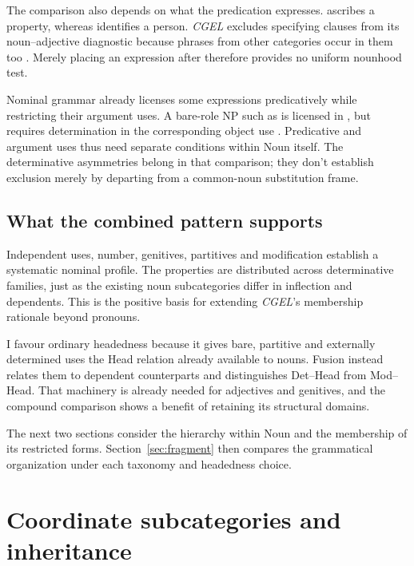 \documentclass[12pt]{article}
\begin{document}
The comparison also depends on what the predication expresses.  ascribes a property, whereas  identifies a person. \textit{CGEL} excludes specifying  clauses from its noun--adjective diagnostic because phrases from other categories occur in them too \citep[536]{huddleston2002}. Merely placing an expression after  therefore provides no uniform nounhood test.

Nominal grammar already licenses some expressions predicatively while restricting their argument uses. A bare-role NP such as  is licensed in , but requires determination in the corresponding object use  \citep[328]{huddleston2002}. Predicative and argument uses thus need separate conditions within Noun itself. The determinative asymmetries belong in that comparison; they don't establish exclusion merely by departing from a common-noun substitution frame.

\subsection{What the combined pattern supports}\label{sec:cumulative}

Independent uses, number, genitives, partitives and modification establish a systematic nominal profile. The properties are distributed across determinative families, just as the existing noun subcategories differ in inflection and dependents. This is the positive basis for extending \textit{CGEL}'s membership rationale beyond pronouns.

I favour ordinary headedness because it gives bare, partitive and externally determined uses the Head relation already available to nouns. Fusion instead relates them to dependent counterparts and distinguishes Det--Head from Mod--Head. That machinery is already needed for adjectives and genitives, and the compound comparison shows a benefit of retaining its structural domains.

The next two sections consider the hierarchy within Noun and the membership of its restricted forms. Section~\ref{sec:fragment} then compares the grammatical organization under each taxonomy and headedness choice.

\section{Coordinate subcategories and inheritance}\label{sec:inheritance}
\end{document}
